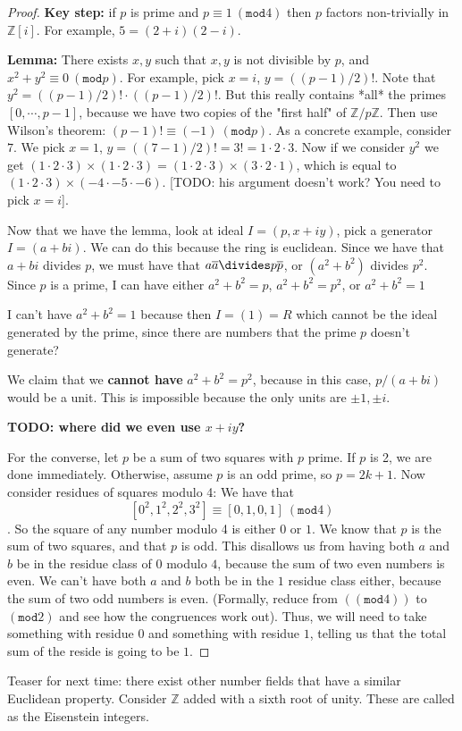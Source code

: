 \documentclass{book}
\theoremstyle{definition}
\newcommand{\Z}{\mathbb Z}
\renewcommand{\mod}[1]{\left( \texttt{mod} #1 \right)}
\begin{document}
\begin{proof}

\textbf{Key step:} if $p$ is prime and $p \equiv 1 ~\mod{4}$ then $p$ factors
non-trivially in $\Z[i]$. For example, $5 = (2+i)(2-i)$.

\textbf{Lemma:} There exists $x, y$ such that $x, y$ is not divisible by $p$,
 and $x^2 + y^2 \equiv 0~\mod{p}$. For example, pick $x = i$, $y = ((p-1)/2)!$.
 Note that $y^2 = ((p-1)/2)! \cdot ((p-1)/2)!$. But this really contains *all*
 the primes $[0, \cdots,p-1]$, because we have two copies of the "first half"
 of $\Z/p\Z$. Then use Wilson's theorem: $(p - 1)! \equiv (-1)~\mod{p}$.
 As a concrete example, consider $7$. We pick $x = 1$, $y=((7-1)/2)! = 3! = 1\cdot 2 \cdot 3$. Now 
 if we consider $y^2$ we get $(1 \cdot 2 \cdot 3)\times (1 \cdot 2 \cdot 3) = (1 \cdot 2 \cdot 3) \times (3 \cdot 2 \cdot 1)$,
 which is equal to $(1 \cdot 2 \cdot 3) \times (-4 \cdot -5 \cdot -6)$.
 [TODO: his argument doesn't work? You need to pick $x = i$].


Now that we have the lemma, look at ideal $I = (p, x + iy)$, pick a generator
$I = (a + bi)$. We can do this because the ring is euclidean. Since we have that
$a+ bi$ divides $p$, we must have that $a \overline{a} \divides p \overline{p}$,
or $(a^2 + b^2)$ divides $p^2$. Since $p$ is a prime,
I can have either $a^2+b^2 = p$, $a^2+b^2 = p^2$, or $a^2 + b^2 = 1$

I can't have $a^2 + b^2 = 1$ because then $I = (1) = R$ which cannot be the ideal
generated by the prime, since there are numbers that the prime $p$ doesn't generate?


We claim that we \textbf{cannot have} $a^2 + b^2 = p^2$, because in this case,
$p/(a+bi)$ would be a unit. This is impossible because the only units are $\pm 1, \pm i$.

\textbf{TODO: where did we even use $x + iy$?}


For the converse, let $p$ be a sum of two squares with $p$ prime. If $p$ is 2,
we are done immediately. Otherwise, assume $p$ is an odd prime, so $p = 2k + 1$.
Now consider residues of squares modulo 4: We have that
$$[0^2, 1^2, 2^2, 3^2] \equiv [0, 1, 0, 1]~\mod{4}$$. So the square of any
number modulo 4 is either $0$ or $1$. We know that $p$ is the sum of two squares, 
and that $p$ is odd. This disallows us from having both $a$ and $b$ be in the
residue class of $0$ modulo $4$, because the sum of two even numbers is even.
We can't have both $a$ and $b$ both be in the $1$ residue class either, because the
sum of two odd numbers is even. (Formally, reduce from $(\mod{4})$ to $\mod{2}$
and see how the congruences work out). Thus, we will need to take something
with residue $0$ and something with residue $1$, telling us that the total
sum of the reside is going to be $1$.

\end{proof}

Teaser for next time: there exist other number fields that have a similar Euclidean
property. Consider $\Z$ added with a sixth root of unity. These are called as the
Eisenstein integers.
\end{document}
